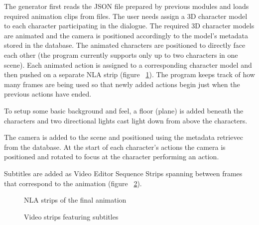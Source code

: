 The generator first reads the JSON file prepared by previous modules and loads required animation clips from files. The user needs assign a 3D character model to each character participating in the dialogue. The required 3D character models are animated and the camera is positioned accordingly to the model's metadata stored in the database. The animated characters are positioned to directly face each other (the program currently supports only up to two characters in one scene). Each animated action is assigned to a corresponding character model and then pushed on a separate NLA strip (figure ~\ref{fig:nla}). The program keeps track of how many frames are being used so that newly added actions begin just when the previous actions have ended.

To setup some basic background and feel, a floor (plane) is added beneath the characters and two directional lights cast light down from above the characters.

The camera is added to the scene and positioned using the metadata retrievec from the database. At the start of each character's actions the camera is positioned and rotated to focus at the character performing an action.

Subtitles are added as Video Editor Sequence Strips spanning between frames that correspond to the animation (figure ~\ref{fig:substrips}).

\begin{figure}[H]
\centerline{}
\caption{NLA strips of the final animation}\label{fig:nla}
\end{figure}
\begin{figure}[H]
\centerline{}
\caption{Video strips featuring subtitles}\label{fig:substrips}
\end{figure}

